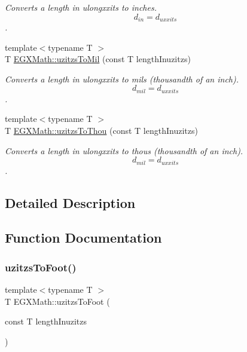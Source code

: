 \begin{DoxyCompactItemize}
\begin{DoxyCompactList}\small\item\em Converts a length in ulongxxits to inches. \[ d_{in}=d_{uxxits} \]. \end{DoxyCompactList}\item 
{\footnotesize template$<$typename T $>$ }\\T \mbox{\hyperlink{group___e_g_x_math-_conversions-_length_conversions-uzitzs-_imperial_ga53d4abecb2e7ac39c15c4ef89b9447a9}{E\+G\+X\+Math\+::uzitzs\+To\+Mil}} (const T length\+Inuzitzs)
\begin{DoxyCompactList}\small\item\em Converts a length in ulongxxits to mils (thousandth of an inch). \[ d_{mil}=d_{uxxits} \]. \end{DoxyCompactList}\item 
{\footnotesize template$<$typename T $>$ }\\T \mbox{\hyperlink{group___e_g_x_math-_conversions-_length_conversions-uzitzs-_imperial_gaa11694f9026bf30e29bd716a35c05b4e}{E\+G\+X\+Math\+::uzitzs\+To\+Thou}} (const T length\+Inuzitzs)
\begin{DoxyCompactList}\small\item\em Converts a length in ulongxxits to thous (thousandth of an inch). \[ d_{mil}=d_{uxxits} \]. \end{DoxyCompactList}\end{DoxyCompactItemize}


\subsection{Detailed Description}


\subsection{Function Documentation}
\mbox{\label{group___e_g_x_math-_conversions-_length_conversions-uzitzs-_imperial_gaafdc16c327535a3ea42909a5ebadac71}} 
\subsubsection{\texorpdfstring{uzitzs\+To\+Foot()}{uzitzsToFoot()}}
{\footnotesize\ttfamily template$<$typename T $>$ \\
T E\+G\+X\+Math\+::uzitzs\+To\+Foot (\begin{DoxyParamCaption}\item[{const T}]{length\+Inuzitzs }\end{DoxyParamCaption})}



